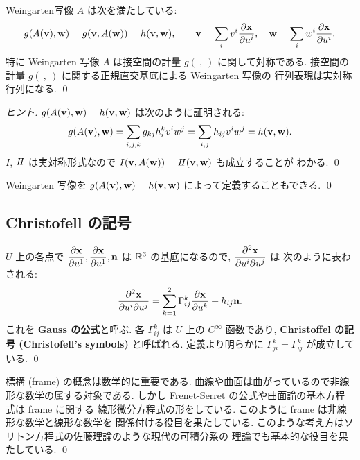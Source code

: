 \documentclass[12pt,twoside]{jarticle}
\begin{document}
\begin{question}[Weingarten写像の対称性]
 \label{q:W-sym}
 Weingarten写像 $A$ は次を満たしている:
 \begin{equation*}
  g(A({\mathbf v}),{\mathbf w}) = g({\mathbf v},A({\mathbf w})) = h({\mathbf v},{\mathbf w}),
  \qquad
  {\mathbf v} = \sum_i v^i \frac{\partial {\mathbf x}}{\partial u^i},
  \quad
  {\mathbf w} = \sum_i w^i \frac{\partial {\mathbf x}}{\partial u^i}.
 \end{equation*}
 特に Weingarten 写像 $A$ は接空間の計量 $g(\ ,\ )$ に関して対称である.
 接空間の計量 $g(\ ,\ )$ に関する正規直交基底による Weingarten 写像の
 行列表現は実対称行列になる.
 \qed
\end{question}

\begin{proof}[ヒント]
 $g(A({\mathbf v}),{\mathbf w})=h({\mathbf v},{\mathbf w})$ は次のように証明される:
 \begin{equation*}
  g(A({\mathbf v}),{\mathbf w})
  = \sum_{i,j,k} g_{kj} h^k_i v^i w^j 
  = \sum_{i,j} h_{ij} v^i w^j
  = h({\mathbf v},{\mathbf w}).
 \end{equation*}
 $I$, $I\!I$ は実対称形式なので $I({\mathbf v},A({\mathbf w}))=I\!I({\mathbf v},{\mathbf w})$ も成立することが
 わかる.
 \qed
\end{proof}

\begin{rem}
 Weingarten 写像を $g(A({\mathbf v}),{\mathbf w})=h({\mathbf v},{\mathbf w})$ によって定義することもできる.
 \qed
\end{rem}


\subsection{Christofell の記号}

\begin{definition}
 $U$ 上の各点で $\dfrac{\partial{\mathbf x}}{\partial u^1},\dfrac{\partial{\mathbf x}}{\partial u^1},{\mathbf n}$ 
 は ${\mathbb R}^3$ の基底になるので, $\dfrac{\partial^2{\mathbf x}}{\partial u^i\partial u^j}$ は
 次のように表わされる:
 \begin{equation*}
  \dfrac{\partial^2{\mathbf x}}{\partial u^i\partial u^j}
  = \sum_{k=1}^2\Gamma^k_{ij}\dfrac{\partial{\mathbf x}}{\partial u^k} + h_{ij}{\mathbf n}.
 \end{equation*}
 これを {\bf Gauss の公式}と呼ぶ.
 各 $\Gamma^k_{ij}$ は $U$ 上の $C^\infty$ 函数であり, 
 {\bf Christoffel の記号 (Christofell's symbols)} と呼ばれる.
 定義より明らかに $\Gamma^k_{ji}=\Gamma^k_{ij}$ が成立している.
 \qed
\end{definition}

\begin{guide}
 標構 (frame) の概念は数学的に重要である.
 曲線や曲面は曲がっているので非線形な数学の属する対象である.
 しかし Frenet-Serret の公式や曲面論の基本方程式は frame に関する
 線形微分方程式の形をしている.
 このように frame は非線形な数学と線形な数学を
 関係付ける役目を果たしている.
 このような考え方はソリトン方程式の佐藤理論のような現代の可積分系の
 理論でも基本的な役目を果たしている.
 \qed
\end{guide}
\end{document}
